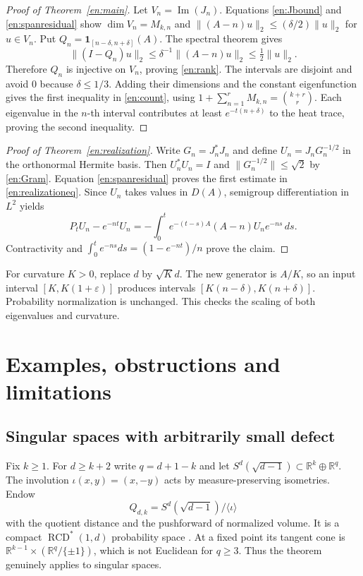 \documentclass[12pt]{amsart}
\theoremstyle{definition}
\theoremstyle{remark}
\numberwithin{equation}{section}
\DeclareMathOperator{\Imageop}{Im}
\newcommand{\Image}[1]{\Imageop(#1)}
\newcommand{\R}{\mathbb{R}}
\newcommand{\RCD}{\operatorname{RCD}^{*}}
\newcommand{\one}{\mathbf 1}
\newcommand{\eps}{\varepsilon}
\theoremstyle{plain}
\begin{document}
\begin{proof}[Proof of Theorem~\ref{en:main}]
Let $V_n=\Image{J_n}$. Equations \eqref{en:Jbound} and
\eqref{en:spanresidual} show $\dim V_n=M_{k,n}$ and
$\|(A-n)u\|_2\leq(\delta/2)\|u\|_2$ for $u\in V_n$.
Put $Q_n=\one_{[n-\delta,n+\delta]}(A)$. The spectral theorem gives
\[
 \|(I-Q_n)u\|_2\leq\delta^{-1}\|(A-n)u\|_2
                         \leq\tfrac12\|u\|_2.
\]
Therefore $Q_n$ is injective on $V_n$, proving \eqref{en:rank}.
The intervals are disjoint and avoid $0$ because $\delta\leq1/3$.
Adding their dimensions and the constant eigenfunction gives the first
inequality in \eqref{en:count}, using
$1+\sum_{n=1}^rM_{k,n}=\binom{k+r}{r}$.
Each eigenvalue in the $n$-th interval contributes at least
$e^{-t(n+\delta)}$ to the heat trace, proving the second inequality.
\end{proof}

\begin{proof}[Proof of Theorem~\ref{en:realization}]
Write $G_n=J_n^*J_n$ and define $U_n=J_nG_n^{-1/2}$ in the
orthonormal Hermite basis. Then $U_n^*U_n=I$ and
$\|G_n^{-1/2}\|\leq\sqrt2$ by \eqref{en:Gram}.
Equation \eqref{en:spanresidual} proves the first estimate in
\eqref{en:realizationeq}. Since $U_n$ takes values in $D(A)$,
semigroup differentiation in $L^2$ yields
\[
 P_tU_n-e^{-nt}U_n
 =-\int_0^t e^{-(t-s)A}(A-n)U_n e^{-ns}\,ds.
\]
Contractivity and $\int_0^te^{-ns}ds=(1-e^{-nt})/n$ prove the claim.
\end{proof}

For curvature $K>0$, replace $d$ by $\sqrt K d$. The new generator is
$A/K$, so an input interval $[K,K(1+\eps)]$ produces intervals
$[K(n-\delta),K(n+\delta)]$. Probability normalization is unchanged.
This checks the scaling of both eigenvalues and curvature.

\section{Examples, obstructions and limitations}
\subsection{Singular spaces with arbitrarily small defect}
Fix $k\geq1$. For $d\geq k+2$ write $q=d+1-k$ and let
$S^d(\sqrt{d-1})\subset\R^k\oplus\R^q$. The involution
$\iota(x,y)=(x,-y)$ acts by measure-preserving isometries. Endow
\[
 Q_{d,k}=S^d(\sqrt{d-1})/\langle\iota\rangle
\]
with the quotient distance and the pushforward of normalized volume.
It is a compact $\RCD(1,d)$ probability space
\cite[Theorem 1.1 and Corollary 1.2]{en:GKMS}.
At a fixed point its tangent cone is
$\R^{k-1}\times(\R^q/\{\pm1\})$, which is not Euclidean for $q\geq3$.
Thus the theorem genuinely applies to singular spaces.
\end{document}
